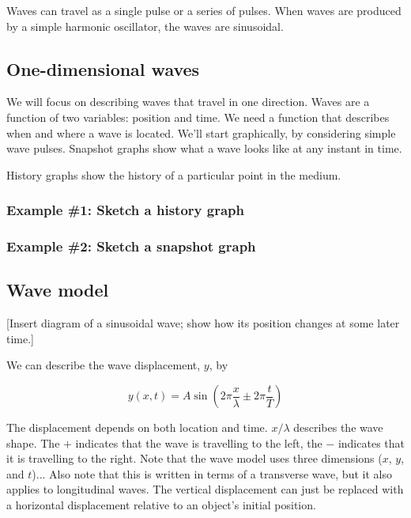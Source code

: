 Waves can travel as a single pulse or a series of pulses. When waves are produced by a simple harmonic oscillator, the waves are sinusoidal.

\subsection{One-dimensional waves}
We will focus on describing waves that travel in one direction. Waves are a function of two variables: position and time. We need a function that describes when and where a wave is located. We'll start graphically, by considering simple wave pulses.
\clearpage
Snapshot graphs show what a wave looks like at any instant in time.
\vspace{8cm}

History graphs show the history of a particular point in the medium.
\vspace{6cm}
\clearpage
\subsubsection{Example \#1: Sketch a history graph}
\vspace{8cm}

\subsubsection{Example \#2: Sketch a snapshot graph}
\vspace{8cm}

\clearpage
\subsection{Wave model}
[Insert diagram of a sinusoidal wave; show how its position changes at some later time.]
\vspace{5cm}

We can describe the wave displacement, $y$, by

$$y(x,t)=A\sin\left(2\pi\frac{x}{\lambda}\pm 2\pi\frac{t}{T}\right)$$

The displacement depends on both location and time. $x/\lambda$ describes the wave shape. The $+$ indicates that the wave is travelling to the left, the $-$ indicates that it is travelling to the right. Note that the wave model uses three dimensions ($x$, $y$, and $t$)... Also note that this is written in terms of a transverse wave, but it also applies to longitudinal waves. The vertical displacement can just be replaced with a horizontal displacement relative to an object's initial position.

